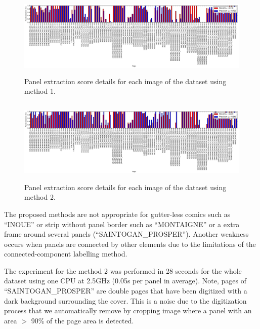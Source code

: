 \begin{figure}
 \includegraphics[width=\textwidth,height=4cm]{Panel_object_Rigaud_CIFED_2012.pdf}
 \caption{Panel extraction score details for each image of the dataset using method 1.
 }
 \label{}
\end{figure}
\begin{figure}
 \includegraphics[width=\textwidth,height=4cm]{Panel_object_proposed.pdf}
 \caption{Panel extraction score details for each image of the dataset using method 2.
 }
 \label{fig:pe:panel_extraction_ijdar}
\end{figure}

The proposed methods are not appropriate for gutter-less comics such as ``INOUE'' or strip without panel border such as ``MONTAIGNE'' or a extra frame around several panels (``SAINTOGAN\_PROSPER'').
Another weakness occurs when panels are connected by other elements due to the limitations of the connected-component labelling method.

The experiment for the method 2 was performed in 28 seconds for the whole dataset using one CPU at 2.5GHz (0.05s per panel in average).
Note, pages of ``SAINTOGAN\_PROSPER'' are double pages that have been digitized with a dark background surrounding the cover.
This is a noise due to the digitization process that we automatically remove by cropping image where a panel with an area $>$ 90\% of the page area is detected.

